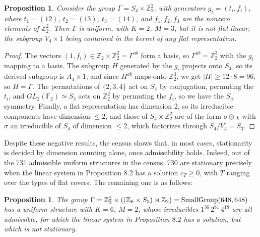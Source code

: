 \documentclass[12pt]{amsart}
\newtheorem{proposition}[theorem]{Proposition}
\theoremstyle{definition}
\begin{document}
\begin{proposition}
Consider the group $\Gamma=S_4\times\mathbb Z_2^2$, with generators $g_i=(t_i,f_i)$, where $t_1=(12)$, $t_2=(13)$, $t_3=(14)$, and $f_1,f_2,f_3$ are the nonzero elements of $\mathbb Z_2^2$. Then $\Gamma$ is uniform, with $K=2$, $M=3$, but it is not flat linear, the subgroup $V_4\times1$ being contained in the kernel of any flat representation.
\end{proposition}

\begin{proof}
The vectors $(1,f_i)\in\mathbb Z_2\times\mathbb Z_2^2=\Gamma^{ab}$ form a basis, so $\Gamma^{ab}=\mathbb Z_2^3$ with the $g_i$ mapping to a basis. The subgroup $H$ generated by the $g_i$ projects onto $S_4$, so its derived subgroup is $A_4\times1$, and since $H^{ab}$ maps onto $\mathbb Z_2^3$, we get $|H|\geq12\cdot8=96$, so $H=\Gamma$. The permutations of $\{2,3,4\}$ act on $S_4$ by conjugation, permuting the $t_i$, and $GL_2(\mathbb F_2)\simeq S_3$ acts on $\mathbb Z_2^2$ by permuting the $f_i$, so we have the $S_3$ symmetry. Finally, a flat representation has dimension 2, so its irreducible components have dimension $\leq2$, and those of $S_4\times\mathbb Z_2^2$ are of the form $\sigma\otimes\chi$ with $\sigma$ an irreducible of $S_4$ of dimension $\leq2$, which factorizes through $S_4/V_4=S_3$.
\end{proof}

Despite these negative results, the census shows that, in most cases, stationarity is decided by dimension counting alone, once admissibility holds. Indeed, out of the 731 admissible uniform structures in the census, 730 are stationary precisely when the linear system in Proposition 8.2 has a solution $c_T\geq0$, with $T$ ranging over the types of flat covers. The remaining one is as follows:

\begin{proposition}
The group $\Gamma=\mathbb Z_3^2\times((\mathbb Z_6\times S_3)\rtimes\mathbb Z_2)={\rm SmallGroup}(648,648)$ has a uniform structure with $K=6$, $M=2$, whose irreducibles $1^{36}\,2^{81}\,4^{18}$ are all admissible, for which the linear system in Proposition $8.2$ has a solution, but which is not stationary.
\end{proposition}
\end{document}
